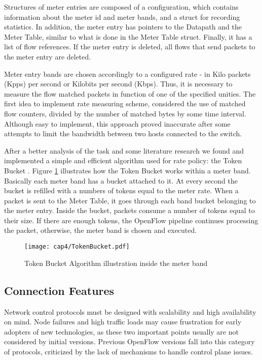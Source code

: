     Structures of meter entries are composed of a configuration, which contains information about the meter id and meter bands, and a struct for recording statistics. In addition, the meter entry has pointers to the Datapath and the Meter Table, similar to what is done in the Meter Table struct. Finally, it has a list of flow references. If the meter entry is deleted, all flows that send packets to the meter entry are deleted. 

    Meter entry bands are chosen accordingly to a configured rate - in Kilo packets (Kpps) per second or Kilobits per second (Kbps). Thus, it is necessary to measure the flow matched packets in function of one of the specified unities. The first idea to implement rate measuring scheme, considered the use of matched flow counters, divided by the number of matched bytes by some time interval. Although easy to implement, this approach proved inaccurate after some attempts to limit the bandwidth between two hosts connected to the switch.  
    
    After a better analysis of the task and some literature research we found and implemented a simple and efficient algorithm used for rate policy: the Token Bucket \cite{Tanenbaum:2002:CN:572404}. Figure \ref{fig:tokenbucket} illustrates how the Token Bucket works within a meter band. Basically each meter band has a bucket attached to it. At every second the bucket is refilled with a numbers of tokens equal to the meter rate. When a packet is sent to the Meter Table, it goes through each band bucket belonging to the meter entry. Inside the bucket, packets consume a number of tokens equal to their size. If there are enough tokens, the OpenFlow pipeline continues processing the packet, otherwise, the meter band is chosen and executed.               

    \begin{figure}[h]
    \centering
    \texttt{[image: cap4/TokenBucket.pdf]}
    \caption{Token Bucket Algorithm illustration inside the meter band}
    \label{fig:tokenbucket}
    \end{figure}

\label{sec:sec44}

\subsection{Connection Features}
\label{sec:sec45}

    Network control protocols must be designed with scalability and high availability on mind. Node failures and high traffic loads may cause frustration for early adopters of new technologies, as these two important points usually are not considered by initial versions. Previous OpenFlow versions fall into this category of protocols, criticized by the lack of mechanisms to handle control plane issues. 
    
